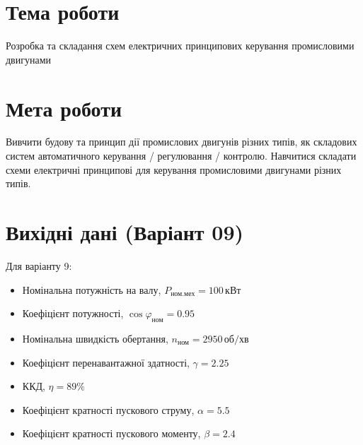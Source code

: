 \documentclass[a4paper]{article}
\begin{document}

    \section*{Тема роботи}
    Розробка та складання схем електричних принципових керування
    промисловими двигунами

    \section*{Мета роботи}
    Вивчити будову та принцип дії промислових двигунів
    різних типів, як складових систем автоматичного
    керування / регулювання / контролю. Навчитися складати схеми електричні
    принципові для керування промисловими двигунами різних типів.

    \section*{Вихідні дані (Варіант 09)}
Для варіанту 9:
\begin{itemize}
    \item Номінальна потужність на валу, \( P_{\text{ном.мех}} = 100 \, \text{кВт} \)
    \item Коефіцієнт потужності, \( \cos \varphi_{\text{ном}} = 0.95 \)
    \item Номінальна швидкість обертання, \( n_{\text{ном}} = 2950 \, \text{об/хв} \)
    \item Коефіцієнт перенавантажної здатності, \( \gamma = 2.25 \)
    \item ККД, \( \eta = 89\% \)
    \item Коефіцієнт кратності пускового струму, \( \alpha =  5.5\)
    \item Коефіцієнт кратності пускового моменту, \( \beta = 2.4 \)
\end{itemize}

    \newpage
    
\end{document}
